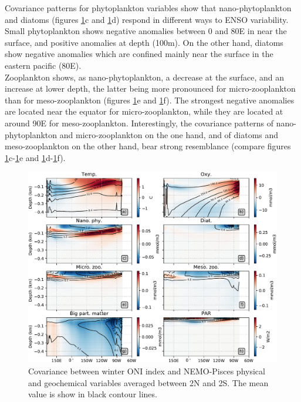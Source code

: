 Covariance patterns for phytoplankton variables show that nano-phytoplankton and diatoms (figures \ref{fig:cov-prof}c and \ref{fig:cov-prof}d) respond in different ways to ENSO variability. Small phytoplankton shows negative anomalies between 0 and 80E in near the surface, and positive anomalies at depth (100m). On the other hand, diatoms show negative anomalies which are confined mainly near the surface in the eastern pacific (80E).\\

Zooplankton shows, as nano-phytoplankton, a decrease at the surface, and an 
increase at lower depth, the latter being more pronounced for micro-zooplankton than for meso-zooplankton (figures \ref{fig:cov-prof}e and \ref{fig:cov-prof}f). The strongest negative anomalies 
are located near the equator for micro-zooplankton, while they are located at around 90E for meso-zooplankton. 
Interestingly, the covariance patterns of nano-phytoplankton and micro-zooplankton on the one hand, and of diatoms and meso-zooplankton on the other hand, bear strong resemblance (compare figures \ref{fig:cov-prof}c-\ref{fig:cov-prof}e and \ref{fig:cov-prof}d-\ref{fig:cov-prof}f). \\

\begin{figure}[h!]
	\centering
	\includegraphics[scale=0.5] {figs/covariance_profiles.pdf}
	\caption{Covariance between winter ONI index and NEMO-Pisces physical and geochemical variables averaged between 2N and 2S. The mean value is show in black contour lines.}
	\label{fig:cov-prof}
\end{figure}

